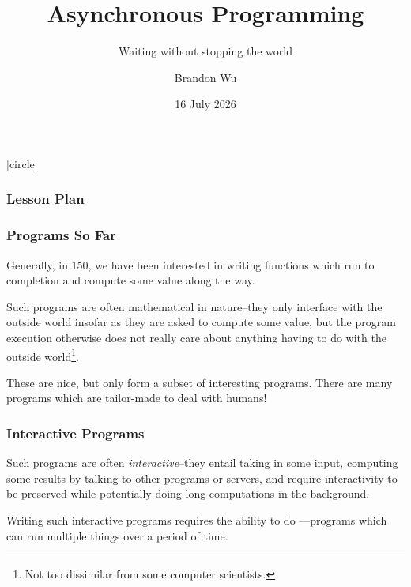 \documentclass[aspectratio=169]{beamer}
\title{Asynchronous Programming} %
\subtitle{Waiting without stopping the world} %
\date{16 July 2026} %
\author{Brandon Wu} %
\newif\ifcolorlambda
\begin{document}
\ifweb
    \renewcommand{\pause}{}
\fi

[circle]

{
\begin{frame}[plain]
    \colorlambdatrue
    \titlepage
\end{frame}
}


\begin{frame}[fragile]
  \frametitle{Lesson Plan}

  \tableofcontents
\end{frame}


\begin{frame}[fragile]
  \frametitle{Programs So Far}

  Generally, in 150, we have been interested in writing functions which
  run to completion and compute some value along the way.

  \pause
  \vspace{\fill}

  Such programs are often mathematical in nature--they only interface
  with the outside world insofar as they are asked to compute some value,
  but the program execution otherwise does not really care about
  anything having to do with the outside world\footnote{Not too dissimilar
  from some computer scientists.}.

  \pause
  \vspace{\fill}

  These are nice, but only form a subset of interesting programs. There
  are many programs which are tailor-made to deal with humans!
\end{frame}

\begin{frame}[fragile]
  \frametitle{Interactive Programs}

  Such programs are often \textit{interactive}--they entail taking in some
  input, computing some results by talking to other programs or servers,
  and require interactivity to be preserved while potentially doing
  long computations in the background.

  \pause
  \vspace{\fill}

  Writing such interactive programs requires the ability to do
  ---programs which can run multiple
  things over a period of time.

  \pause
  \vspace{\fill}

\end{frame}
\end{document}
